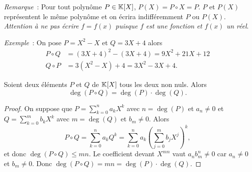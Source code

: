 \emph{Remarque}~: Pour tout polynôme $P \in \mathbb{K}[X]$, $P(X)=P \circ X = P$. $P$ et $P(X)$ représentent le même polynôme et on écrira indifféremment $P$ ou $P(X)$. \emph{Attention à ne pas écrire $f=f(x)$ puisque $f$ est une fonction et $f(x)$ un réel}.

\emph{Exemple}~: On pose $P=X^2-X$ et $Q=3X+4$ alors
\begin{align}
  P \circ Q &= (3X+4)^2-(3X+4) = 9X^2+21X+12\\
  Q \circ P &= 3(X^2-X)+4 = 3X^2-3X+4.
\end{align}

\begin{prop}
  Soient deux éléments $P$ et $Q$ de $\mathbb{K}[X]$ tous les deux non nuls. Alors
  \begin{equation}
    \deg(P\circ Q)=\deg(P) \cdot \deg(Q).
  \end{equation}
\end{prop}
\begin{proof}
  On suppose que $P=\sum_{k=0}^n a_k X^k$ avec $n=\deg(P)$ et $a_n \neq 0$ et $Q=\sum_{k=0}^m b_k X^k$ avec $m=\deg(Q)$ et $b_m \neq 0$. Alors
  \begin{equation}
    P \circ Q = \sum_{k=0}^n a_k Q^k = \sum_{k=0}^n a_k \left(\sum_{j=0}^m b_j X^j\right)^k,
  \end{equation}
  et donc $\deg(P \circ Q) \leq mn$. Le coefficient devant $X^{mn}$ vaut $a_n b_m^n \neq 0$ car $a_n \neq 0$ et $b_m \neq 0$. Donc $\deg(P \circ Q) =mn = \deg(P) \cdot \deg(Q)$.
\end{proof}

